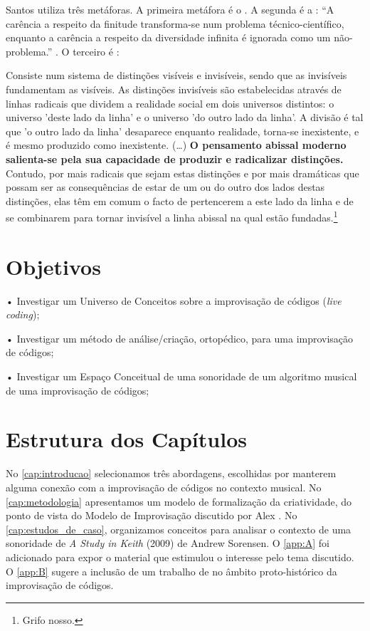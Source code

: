 Santos utiliza três metáforas. A primeira metáfora é o . A segunda é a : ``A carência a respeito da finitude transforma-se num problema técnico-científico, enquanto a carência a respeito da diversidade infinita é ignorada como um não-problema.'' \cite[p.~15]{santos_filosofia_2008}. O terceiro é  \cite[p.~1--4]{santos_abissal_2007}:

\begin{citacao}
Consiste num sistema de distinções visíveis e invisíveis, sendo que as invisíveis fundamentam as visíveis. As distinções invisíveis são estabelecidas através de linhas radicais que dividem a realidade social em dois universos distintos: o universo  'deste lado da linha' e o universo 'do outro lado da linha'. A divisão é tal que 'o outro lado da linha' desaparece enquanto realidade, torna-se inexistente, e é mesmo produzido como inexistente. (\ldots) \textbf{O pensamento abissal moderno salienta-se pela sua capacidade de produzir e radicalizar distinções.} Contudo, por mais radicais que sejam estas distinções e por mais dramáticas que possam ser as consequências de estar de um ou do outro dos lados destas distinções, elas têm em comum o facto de pertencerem a este lado da linha e de se combinarem para tornar invisível a linha abissal na qual estão fundadas.\footnote{Grifo nosso.} 
\end{citacao}

\section*{Objetivos}\label{sec:objetivos}

• Investigar um Universo de Conceitos sobre a improvisação de códigos (\emph{live coding});

• Investigar um método de análise/criação, ortopédico, para uma improvisação de códigos;

• Investigar um Espaço Conceitual de uma sonoridade de um algoritmo musical de uma improvisação de códigos;

\section*{Estrutura dos Capítulos}

No \autoref{cap:introducao} selecionamos três abordagens, escolhidas por manterem alguma conexão com a improvisação de códigos no contexto musical.  No \autoref{cap:metodologia} apresentamos um modelo de formalização da criatividade, do ponto de vista do Modelo de Improvisação discutido por Alex . No \autoref{cap:estudos_de_caso}, organizamos conceitos para analisar o contexto de uma sonoridade  de \emph{A Study in Keith} (2009) de Andrew Sorensen.  O \autoref{app:A} foi adicionado para expor o material que estimulou o interesse pelo tema discutido. O \autoref{app:B} sugere a inclusão de um trabalho de  no âmbito proto-histórico da improvisação de códigos.